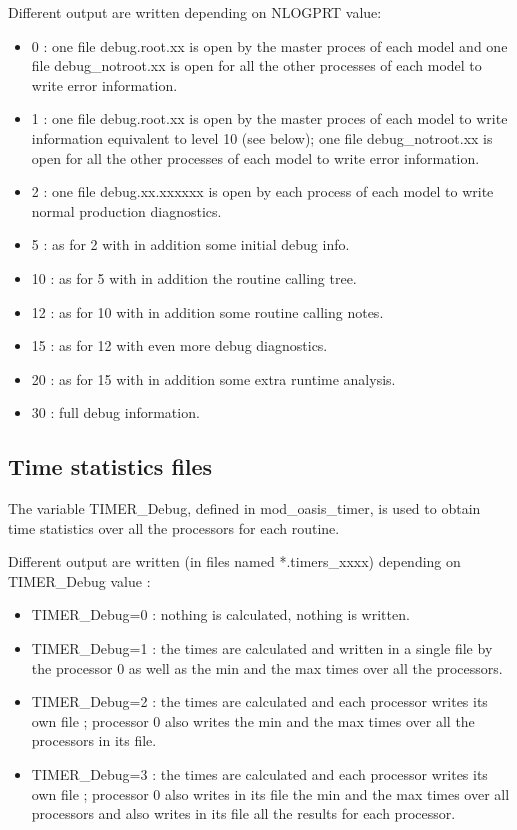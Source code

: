 Different output are written depending on NLOGPRT value:
\begin{itemize}
\item {0}  : one file debug.root.xx is open by the master proces of each model and one file debug\_notroot.xx is open for all the other processes of each model to write error information.
\item {1}  : one file debug.root.xx is open by the master proces of each model to write information equivalent to level 10 (see below); one file debug\_notroot.xx is open for all the other processes of each model to write error information.
\item {2}  : one file debug.xx.xxxxxx is open by each process of each model to write normal production diagnostics.
\item {5}  : as for 2 with in addition some initial debug info.
\item {10} : as for 5 with in addition the routine calling tree.
\item {12} : as for 10 with in addition some routine calling notes.
\item {15} : as for 12 with even more debug diagnostics.
\item {20} : as for 15 with in addition some extra runtime analysis.
\item {30} : full debug information.
\end{itemize}

\subsection{Time statistics files}

The variable TIMER\_Debug, defined in mod\_oasis\_timer, is used to obtain time statistics over all the processors for each routine.

Different output are written (in files named *.timers\_xxxx) depending on TIMER\_Debug value :

\begin{itemize}
\item {TIMER\_Debug=0} : nothing is calculated, nothing is written.
\item {TIMER\_Debug=1} : the times are calculated and written in a single file by the processor 0 as well as 
the min and the max times over all the processors.
\item {TIMER\_Debug=2} : the times are calculated and each processor writes its own file ; processor 0 also 
writes the min and the max times over all the processors in its file.
\item {TIMER\_Debug=3} : the times are calculated and each processor writes its own file ; processor 0 also 
writes in its file the min and the max times over all processors and also writes in its file all the results for each processor.
\end{itemize}

